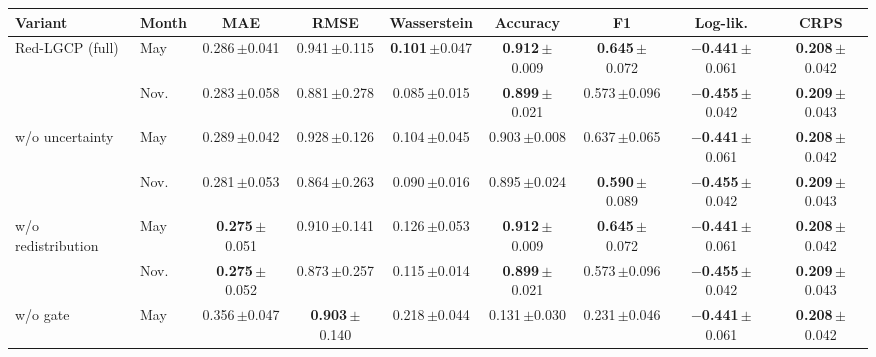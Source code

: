\begin{table}[t]
\centering
\footnotesize
\setlength{\tabcolsep}{2.5pt}
\begin{tabular}{llccccccc}
\toprule
Variant & Month & MAE & RMSE & Wasserstein & Accuracy & F1 & Log-lik. & CRPS \\
\midrule
\multirow{2}{*}{Red-LGCP (full)} & May & 0.286\,{\scriptsize$\pm$0.041} & 0.941\,{\scriptsize$\pm$0.115} & \textbf{0.101}\,{\scriptsize$\pm$0.047} & \textbf{0.912}\,{\scriptsize$\pm$0.009} & \textbf{0.645}\,{\scriptsize$\pm$0.072} & \textbf{$-$0.441}\,{\scriptsize$\pm$0.061} & \textbf{0.208}\,{\scriptsize$\pm$0.042} \\
 & Nov. & 0.283\,{\scriptsize$\pm$0.058} & 0.881\,{\scriptsize$\pm$0.278} & 0.085\,{\scriptsize$\pm$0.015} & \textbf{0.899}\,{\scriptsize$\pm$0.021} & 0.573\,{\scriptsize$\pm$0.096} & \textbf{$-$0.455}\,{\scriptsize$\pm$0.042} & \textbf{0.209}\,{\scriptsize$\pm$0.043} \\
\midrule
\multirow{2}{*}{w/o uncertainty} & May & 0.289\,{\scriptsize$\pm$0.042} & 0.928\,{\scriptsize$\pm$0.126} & 0.104\,{\scriptsize$\pm$0.045} & 0.903\,{\scriptsize$\pm$0.008} & 0.637\,{\scriptsize$\pm$0.065} & \textbf{$-$0.441}\,{\scriptsize$\pm$0.061} & \textbf{0.208}\,{\scriptsize$\pm$0.042} \\
 & Nov. & 0.281\,{\scriptsize$\pm$0.053} & 0.864\,{\scriptsize$\pm$0.263} & 0.090\,{\scriptsize$\pm$0.016} & 0.895\,{\scriptsize$\pm$0.024} & \textbf{0.590}\,{\scriptsize$\pm$0.089} & \textbf{$-$0.455}\,{\scriptsize$\pm$0.042} & \textbf{0.209}\,{\scriptsize$\pm$0.043} \\
\midrule
\multirow{2}{*}{w/o redistribution} & May & \textbf{0.275}\,{\scriptsize$\pm$0.051} & 0.910\,{\scriptsize$\pm$0.141} & 0.126\,{\scriptsize$\pm$0.053} & \textbf{0.912}\,{\scriptsize$\pm$0.009} & \textbf{0.645}\,{\scriptsize$\pm$0.072} & \textbf{$-$0.441}\,{\scriptsize$\pm$0.061} & \textbf{0.208}\,{\scriptsize$\pm$0.042} \\
 & Nov. & \textbf{0.275}\,{\scriptsize$\pm$0.052} & 0.873\,{\scriptsize$\pm$0.257} & 0.115\,{\scriptsize$\pm$0.014} & \textbf{0.899}\,{\scriptsize$\pm$0.021} & 0.573\,{\scriptsize$\pm$0.096} & \textbf{$-$0.455}\,{\scriptsize$\pm$0.042} & \textbf{0.209}\,{\scriptsize$\pm$0.043} \\
\midrule
\multirow{2}{*}{w/o gate} & May & 0.356\,{\scriptsize$\pm$0.047} & \textbf{0.903}\,{\scriptsize$\pm$0.140} & 0.218\,{\scriptsize$\pm$0.044} & 0.131\,{\scriptsize$\pm$0.030} & 0.231\,{\scriptsize$\pm$0.046} & \textbf{$-$0.441}\,{\scriptsize$\pm$0.061} & \textbf{0.208}\,{\scriptsize$\pm$0.042} \\

\end{tabular}
\end{table}

